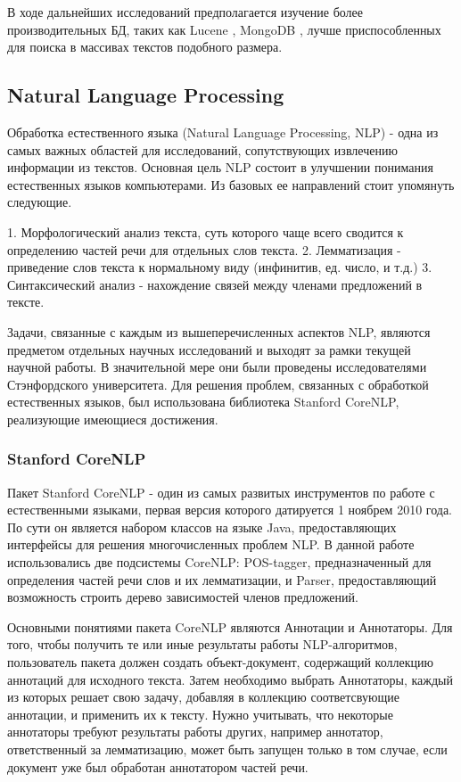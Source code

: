 В ходе дальнейших исследований предполагается изучение более производительных БД, таких
как Lucene \cite{lucene}, MongoDB \cite{mongoDB}, лучше приспособленных для поиска в
массивах текстов подобного размера.

\subsection{Natural Language Processing}

Обработка естественного языка (Natural Language Processing, NLP)\cite{textminingsurvey} - одна из самых 
важных областей для исследований, сопутствующих извлечению информации из текстов.
Основная цель NLP состоит в улучшении понимания естественных языков компьютерами.
Из базовых ее направлений стоит упомянуть следующие.

1. Морфологический анализ текста, суть которого чаще всего сводится к определению
частей речи для отдельных слов текста.
2. Лемматизация - приведение слов текста к нормальному виду (инфинитив, ед. число, и т.д.)
3. Синтаксический анализ - нахождение связей между членами предложений в тексте.

Задачи, связанные с каждым из вышеперечисленных аспектов NLP, 
являются предметом отдельных научных исследований и выходят за рамки текущей научной работы.
В значительной мере они были проведены исследователями Стэнфордского университета. 
Для решения проблем, связанных с обработкой естественных языков, был использована библиотека  Stanford CoreNLP,
реализующие имеющиеся достижения.

\subsubsection{Stanford CoreNLP}
Пакет Stanford CoreNLP\cite{corenlp} - один из самых развитых инструментов по работе 
с естественными языками, первая версия которого датируется 1 ноябрем 2010 года.
По сути он является набором классов на языке Java, предоставляющих интерфейсы
для решения многочисленных проблем NLP. В данной работе использовались две подсистемы CoreNLP:
POS-tagger, предназначенный для определения частей речи слов и их лемматизации,
и Parser, предоставляющий возможность строить дерево зависимостей членов предложений.

Основными понятиями пакета CoreNLP являются Аннотации и Аннотаторы. 
Для того, чтобы получить те или иные результаты работы NLP-алгоритмов,
пользователь пакета должен создать объект-документ,
содержащий коллекцию аннотаций для исходного текста. 
Затем необходимо выбрать Аннотаторы, каждый из которых решает свою задачу, 
добавляя в коллекцию соответсвующие аннотации, и применить их к тексту. 
Нужно учитывать, что некоторые аннотаторы требуют результаты работы других,
например аннотатор, ответственный за лемматизацию, может быть запущен
только в том случае, если документ уже был обработан аннотатором частей речи.

